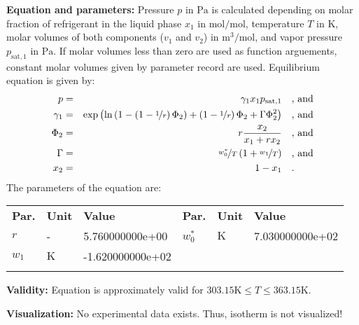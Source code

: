 \textbf{Equation and parameters:}
\newline
%
Pressure $p$ in $\si{\pascal}$ is calculated depending on molar fraction of refrigerant in the liquid phase $x_1$ in $\si{\mole\per\mole}$, temperature $T$ in $\si{\kelvin}$, molar volumes of both components ($v_1$ and $v_2$) in $\si{\cubic\meter\per\mole}$, and vapor pressure $p_\mathrm{sat,1}$ in $\si{\pascal}$. If molar volumes less than zero are used as function arguements, constant molar volumes given by parameter record are used. Equilibrium equation is given by:
%
\begin{equation*}
\begin{split}
p &=& \gamma_1 x_1 p_\mathrm{sat,1} & \quad\text{, and} \\
\gamma_1 &=& \exp \left( \ln \left( 1 - \left( 1 - \nicefrac{1}{r} \right) \Phi_2  \right) + \left(1 - \nicefrac{1}{r}\right) \Phi_2 + \Gamma \Phi_2 ^2 \right) & \quad\text{, and} \\
\Phi_2 &=& r \frac{x_2}{x_1 + r x_2} & \quad\text{, and} \\
\Gamma &=& \nicefrac{w_0^{*}}{T} \left( 1 + \nicefrac{w_1}{T} \right) & \quad\text{, and} \\
x_2 &=& 1 - x_1  & \quad\text{.} \\
\end{split}
\end{equation*}
%
The parameters of the equation are:
%
\begin{longtable}[l]{lll|lll}
\toprule
\addlinespace
\textbf{Par.} & \textbf{Unit} & \textbf{Value} &	\textbf{Par.} & \textbf{Unit} & \textbf{Value} \\
\addlinespace
\midrule
\endhead

\bottomrule
\endfoot
\bottomrule
\endlastfoot
\addlinespace

$r$ & - & 5.760000000e+00 & $w_0^{*}$ & $\si{\kelvin}$ & 7.030000000e+02 \\
$w_1$ & $\si{\kelvin}$ & -1.620000000e+02 & & & \\

\addlinespace\end{longtable}

\textbf{Validity:}
\newline
Equation is approximately valid for $303.15 \si{\kelvin} \leq T \leq 363.15 \si{\kelvin}$.
\newline

\textbf{Visualization:}
%
\newline
No experimental data exists. Thus, isotherm is not visualized!
%

